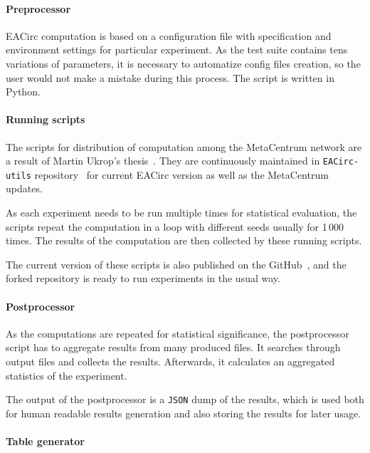 \documentclass[
    digital,    %
    oneside,    %
    color,
    11pt,
    nocover,
    notable,
    nolof,
    nolot,
]{fithesis3}
\begin{document}
\paragraph{Preprocessor}

EACirc computation is based on a configuration file with specification and environment settings for particular experiment. As the test suite contains tens variations of parameters, it is necessary to automatize config files creation, so the user would not make a mistake during this process. The script is written in Python.

\paragraph{Running scripts}

The scripts for distribution of computation among the MetaCentrum network are a result of Martin Ukrop's thesis~\cite{ukropMgrThesis}. They are continuously maintained in \texttt{EACirc-utils} repository~\cite{eaUtils} for current EACirc version as well as the MetaCentrum updates.

As each experiment needs to be run multiple times for statistical evaluation, the scripts repeat the computation in a loop with different seeds usually for 1\,000 times. The results of the computation are then collected by these running scripts.

The current version of these scripts is also published on the GitHub~\cite{eaUtils}, and the forked repository is ready to run experiments in the usual way.

\paragraph{Postprocessor}

As the computations are repeated for statistical significance, the postprocessor script has to aggregate results from many produced files. It searches through output files and collects the results. Afterwards, it calculates an aggregated statistics of the experiment.

The output of the postprocessor is a \texttt{JSON} dump of the results, which is used both for human readable results generation and also storing the results for later usage.

\paragraph{Table generator}
\end{document}
